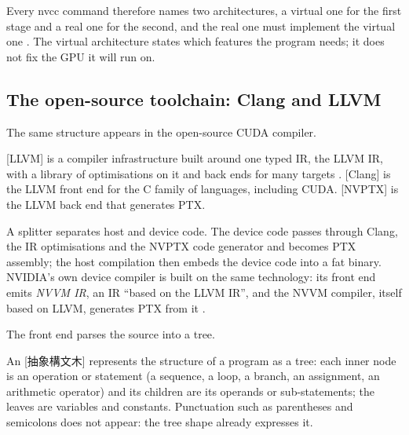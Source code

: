 \documentclass[../main.tex]{subfiles}
\begin{document}
Every nvcc command therefore names two architectures, a virtual one for
the first stage and a real one for the second, and the real one must
implement the virtual one \cite[§5.4]{nvidia2026nvcc}.  The virtual
architecture states which features the program needs; it does not fix
the GPU it will run on.

\subsection{The open-source toolchain: Clang and LLVM}

The same structure appears in the open-source CUDA compiler.

\begin{definition}
  [LLVM] is a compiler infrastructure built around one typed
  IR, the LLVM IR, with a library of optimisations on it and back ends
  for many targets \cite{lattner2004llvm}.
  [Clang] is the LLVM front end for the C family of
  languages, including CUDA.  [NVPTX] is the LLVM back end
  that generates PTX.
\end{definition}

A splitter separates host and device code.  The device code passes
through Clang, the IR optimisations and the NVPTX code generator and
becomes PTX assembly; the host compilation then embeds the device code
into a fat binary.  NVIDIA's
own device compiler is built on the same technology: its front end
emits \emph{NVVM IR}, an IR \enquote{based on the LLVM IR}, and the
NVVM compiler, itself based on LLVM, generates PTX from it
\cite{nvidia2026nvvm}.

The front end parses the source into a tree.

\begin{definition}
  An [抽象構文木] represents the
  structure of a program as a tree: each inner node is an operation or
  statement (a sequence, a loop, a branch, an assignment, an
  arithmetic operator) and its children are its operands or
  sub-statements; the leaves are variables and
  constants.
  Punctuation such as parentheses and semicolons does not appear: the
  tree shape already expresses it.
\end{definition}
\end{document}
